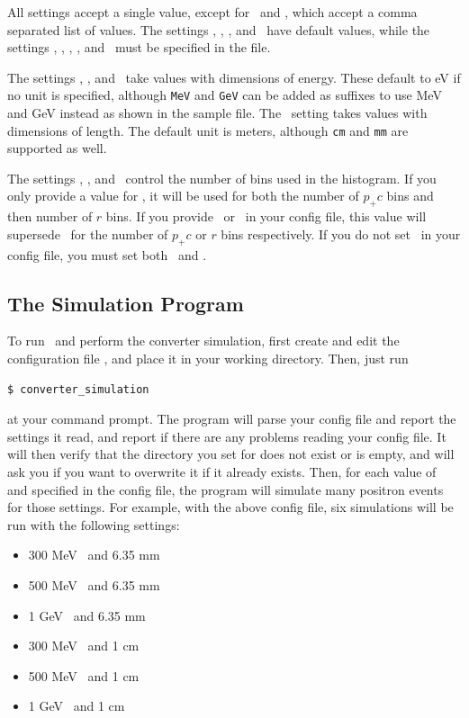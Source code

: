 \documentclass[12pt]{article}
\begin{document}
All settings accept a single value, except for \pcin \, and \targett, which accept a comma separated list of values.
The settings \outpcmin, \outdir, \numbins, and \fitxpt \, have default values, while the settings \targetm, \targett, \pcin, \outpcmax, and \dxydsmax \, must be specified in the file.

The settings \pcin, \outpcmin, and \outpcmax \, take values with dimensions of energy.
These default to eV if no unit is specified, although \texttt{MeV} and \texttt{GeV} can be added as suffixes to use MeV and GeV instead as shown in the sample file.
The \targett \, setting takes values with dimensions of length.
The default unit is meters, although \texttt{cm} and \texttt{mm} are supported as well.

The settings \numbins, \numpcbins, and \numrbins \, control the number of bins used in the histogram.
If you only provide a value for \numbins, it will be used for both the number of $p_+c$ bins and then number of $r$ bins.
If you provide \numpcbins \, or \numrbins \, in your config file, this value will supersede \numbins \, for the number of $p_+ c$ or $r$ bins respectively.
If you do not set \numbins \, in your config file, you must set both \numpcbins \, and \numrbins.

\subsection{The Simulation Program}

To run \exes \, and perform the converter simulation, first create and edit the configuration file \configfile, and place it in your working directory.
Then, just run
\begin{verbatim}
$ converter_simulation
\end{verbatim}
at your command prompt.
The program will parse your config file and report the settings it read, and report if there are any problems reading your config file.
It will then verify that the directory you set for \outdir does not exist or is empty, and will ask you if you want to overwrite it if it already exists.
Then, for each value of \pcin \, and \targett specified in the config file, the program will simulate many positron events for those settings.
For example, with the above config file, six simulations will be run with the following settings:
\begin{itemize}
\item
300 MeV \pcin \, and 6.35 mm \targett

\item
500 MeV \pcin \, and 6.35 mm \targett

\item
1 GeV \pcin \, and 6.35 mm \targett

\item
300 MeV \pcin \, and 1 cm \targett

\item
500 MeV \pcin \, and 1 cm \targett

\item
1 GeV \pcin \, and 1 cm \targett
\end{itemize}
\end{document}
